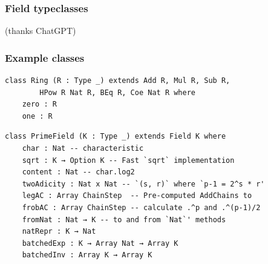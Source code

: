 \documentclass[options]{beamer}
\begin{document}
\begin{frame}
    \frametitle{Field typeclasses}


    (thanks ChatGPT)

\end{frame}

\begin{frame}[fragile]
    \frametitle{Example classes}

\begin{verbatim}
class Ring (R : Type _) extends Add R, Mul R, Sub R, 
        HPow R Nat R, BEq R, Coe Nat R where
    zero : R
    one : R
\end{verbatim}

\begin{verbatim}
class PrimeField (K : Type _) extends Field K where
    char : Nat -- characteristic
    sqrt : K → Option K -- Fast `sqrt` implementation
    content : Nat -- char.log2
    twoAdicity : Nat x Nat -- `(s, r)` where `p-1 = 2^s * r'
    legAC : Array ChainStep  -- Pre-computed AddChains to
    frobAC : Array ChainStep -- calculate .^p and .^(p-1)/2
    fromNat : Nat → K -- to and from `Nat`' methods
    natRepr : K → Nat
    batchedExp : K → Array Nat → Array K
    batchedInv : Array K → Array K
\end{verbatim}

\end{frame}
\end{document}
